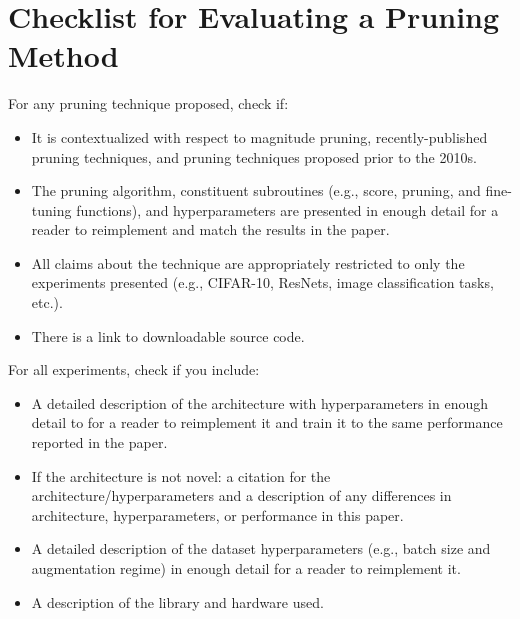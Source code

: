 
\section{Checklist for Evaluating a Pruning Method} \label{apx:recommendations}

\noindent For any pruning technique proposed, check if:
\begin{itemize}
\item It is contextualized with respect to magnitude pruning, recently-published pruning techniques, and pruning techniques proposed prior to the 2010s.
\item The pruning algorithm, constituent subroutines (e.g., score, pruning, and fine-tuning functions), and hyperparameters are presented in enough detail for a reader to reimplement and match the results in the paper.
\item All claims about the technique are appropriately restricted to only the experiments presented (e.g., CIFAR-10, ResNets, image classification tasks, etc.).
\item There is a link to downloadable source code.
\end{itemize}

\noindent For all experiments, check if you include:
\begin{itemize}
\item A detailed description of the architecture with hyperparameters in enough detail to for a reader to reimplement it and train it to the same performance reported in the paper.
\item If the architecture is not novel: a citation for the architecture/hyperparameters and a description of any differences in architecture, hyperparameters, or performance in this paper.
\item A detailed description of the dataset hyperparameters (e.g., batch size and augmentation regime) in enough detail for a reader to reimplement it.
\item A description of the library and hardware used.
\end{itemize}

